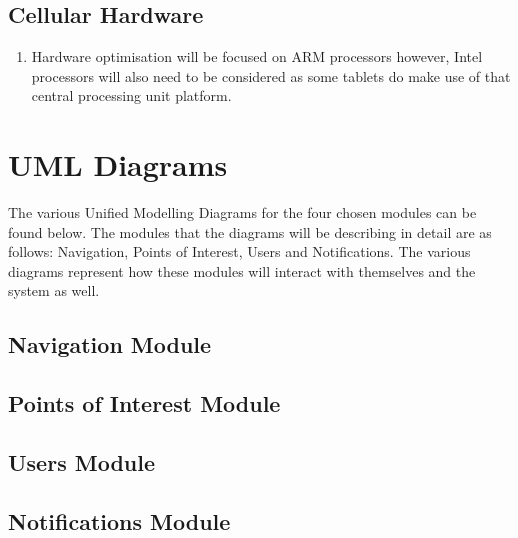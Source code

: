 \documentclass[11pt]{article}
\begin{document}
\subsection{Cellular Hardware}

\begin{enumerate}

\item Hardware optimisation will be focused on ARM processors however, Intel processors will also need to be considered as some tablets do make use of that central processing unit platform.

\end{enumerate}

\newpage

\section{UML Diagrams}
The various Unified Modelling Diagrams for the four chosen modules can be found below. The modules that the diagrams will be describing in detail are as follows: Navigation, Points of Interest, Users and Notifications. The various diagrams represent how these modules will interact with themselves and the system as well. 

\subsection{Navigation Module}

\subsection{Points of Interest Module}

\subsection{Users Module}

\subsection{Notifications Module}
\end{document}

